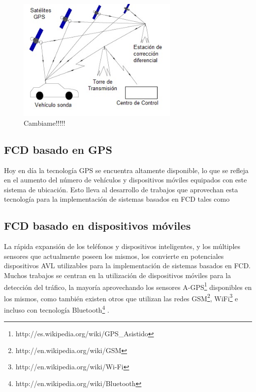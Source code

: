 \begin{figure}[h]
	\centering
	\includegraphics[width=0.7\textwidth]{capitulos/3/figuras/figura4.jpg}
	\caption{\label{fig:ComunicacionGPS}  Cambiame!!!!!}	
\end{figure}

\subsection{FCD basado en GPS}

Hoy en día la tecnología GPS se encuentra altamente disponible, lo que se refleja en el aumento del número de vehículos y dispositivos móviles equipados con este sistema de ubicación. Esto lleva al desarrollo de trabajos que aprovechan esta tecnología para la implementación de sistemas basados en FCD tales como  \cite{giovannini2011novel,li2007practical,sevlian2010travel,yin2004weight}


\subsection{FCD basado en dispositivos móviles}

La rápida expansión de los teléfonos y dispositivos inteligentes, y los múltiples sensores que actualmente poseen los mismos, los convierte en potenciales dispositivos AVL utilizables para la implementación de sistemas basados en FCD. Muchos trabajos se centran en la utilización de dispositivos móviles para la detección del tráfico, la mayoría aprovechando los sensores A-GPS\footnote{http://es.wikipedia.org/wiki/GPS\_Asistido} disponibles en los mismos, como también existen otros que utilizan las redes GSM\footnote{http://en.wikipedia.org/wiki/GSM}, WiFi\footnote{http://en.wikipedia.org/wiki/Wi-Fi} e incluso con tecnología Bluetooth\footnote{http://en.wikipedia.org/wiki/Bluetooth} \cite{thiagarajan2010cooperative,thiagarajan2009vtrack,fraser2007use,fang2011enacq,ruppe2012augmenting}.

